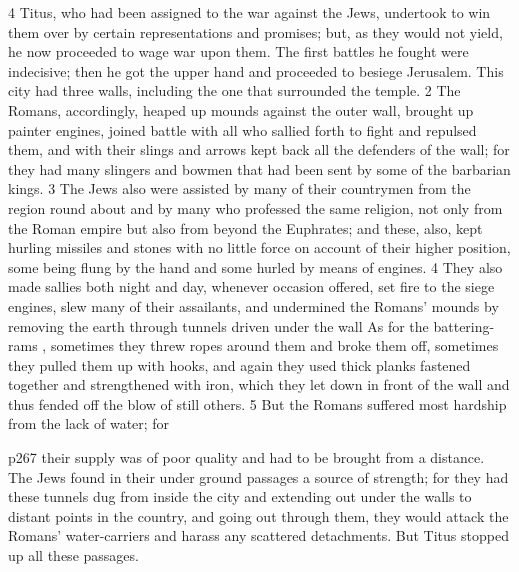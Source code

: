 4
Titus, who had been assigned to the war against the Jews, undertook to win them over by certain representations and promises; but, as they would not yield, he now proceeded to wage war upon them. The first battles he fought were indecisive; then he got the upper hand and proceeded to besiege Jerusalem. This city had three walls, including the one that surrounded the temple. 2 The Romans, accordingly, heaped up mounds against the outer wall, brought up painter engines, joined battle with all who sallied forth to fight and repulsed them, and with their slings and arrows kept back all the defenders of the wall; for they had many slingers and bowmen that had been sent by some of the barbarian kings. 3 The Jews also were assisted by many of their countrymen from the region round about and by many who professed the same religion, not only from the Roman empire but also from beyond the Euphrates; and these, also, kept hurling missiles and stones with no little force on account of their higher position, some being flung by the hand and some hurled by means of engines. 4 They also made sallies both night and day, whenever occasion offered, set fire to the siege engines, slew many of their assailants, and undermined the Romans' mounds by removing the earth through tunnels driven under the wall As for the battering-rams , sometimes they threw ropes around them and broke them off, sometimes they pulled them up with hooks, and again they used thick planks fastened together and strengthened with iron, which they let down in front of the wall and thus fended off the blow of still others. 5 But the Romans suffered most hardship from the lack of water; for

p267 their supply was of poor quality and had to be brought from a distance. The Jews found in their under ­ground passages a source of strength; for they had these tunnels dug from inside the city and extending out under the walls to distant points in the country, and going out through them, they would attack the Romans' water-carriers and harass any scattered detachments. But Titus stopped up all these passages.

